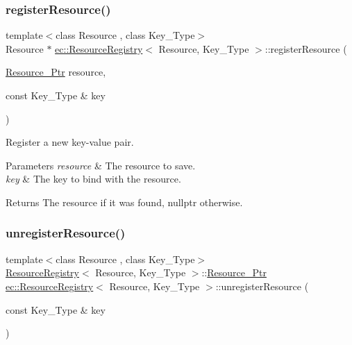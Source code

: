 \subsubsection{\texorpdfstring{register\+Resource()}{registerResource()}}
{\footnotesize\ttfamily template$<$class Resource , class Key\+\_\+\+Type$>$ \\
Resource $\ast$ \mbox{\hyperlink{classec_1_1_resource_registry}{ec\+::\+Resource\+Registry}}$<$ Resource, Key\+\_\+\+Type $>$\+::register\+Resource (\begin{DoxyParamCaption}\item[{\mbox{\hyperlink{classec_1_1_resource_registry_aa3069d67662599730165c5d0df3043c9}{Resource\+\_\+\+Ptr}}}]{resource,  }\item[{const Key\+\_\+\+Type \&}]{key }\end{DoxyParamCaption})}



Register a new key-\/value pair. 


\begin{DoxyParams}{Parameters}
{\em resource} & The resource to save. \\
\hline
{\em key} & The key to bind with the resource. \\
\hline
\end{DoxyParams}
\begin{DoxyReturn}{Returns}
The resource if it was found, nullptr otherwise. 
\end{DoxyReturn}
\mbox{\label{classec_1_1_resource_registry_a637ecd8b81f8efe21b7c5153213b8213}} 
\subsubsection{\texorpdfstring{unregister\+Resource()}{unregisterResource()}}
{\footnotesize\ttfamily template$<$class Resource , class Key\+\_\+\+Type$>$ \\
\mbox{\hyperlink{classec_1_1_resource_registry}{Resource\+Registry}}$<$ Resource, Key\+\_\+\+Type $>$\+::\mbox{\hyperlink{classec_1_1_resource_registry_aa3069d67662599730165c5d0df3043c9}{Resource\+\_\+\+Ptr}} \mbox{\hyperlink{classec_1_1_resource_registry}{ec\+::\+Resource\+Registry}}$<$ Resource, Key\+\_\+\+Type $>$\+::unregister\+Resource (\begin{DoxyParamCaption}\item[{const Key\+\_\+\+Type \&}]{key }\end{DoxyParamCaption})}



